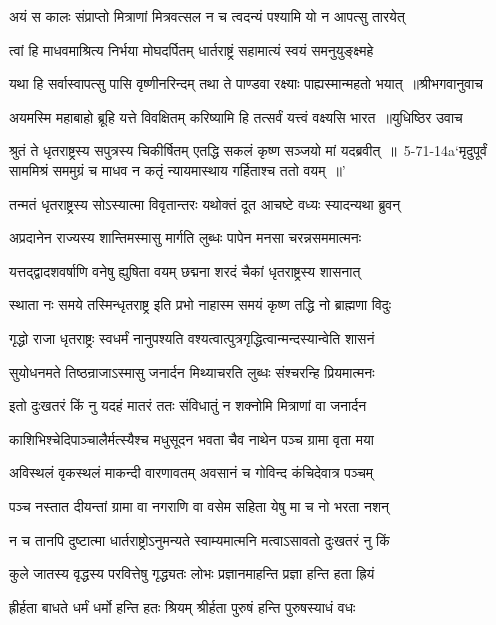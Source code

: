\twolineshloka
{अयं स कालः संप्राप्तो मित्राणां मित्रवत्सल}
{न च त्वदन्यं पश्यामि यो न आपत्सु तारयेत्}


\twolineshloka
{त्वां हि माधवमाश्रित्य निर्भया मोघदर्पितम्}
{धार्तराष्ट्रं सहामात्यं स्वयं समनुयुङ्क्ष्महे}


\threelineshloka
{यथा हि सर्वास्वापत्सु पासि वृष्णीनरिन्दम्}
{तथा ते पाण्डवा रक्ष्याः पाह्यस्मान्महतो भयात् ॥श्रीभगवानुवाच}
{}


\threelineshloka
{अयमस्मि महाबाहो ब्रूहि यत्ते विवक्षितम्}
{करिष्यामि हि तत्सर्वं यत्त्वं वक्ष्यसि भारत ॥युधिष्ठिर उवाच}
{}


\threelineshloka
{श्रुतं ते धृतराष्ट्रस्य सपुत्रस्य चिकीर्षितम्}
{एतद्धि सकलं कृष्ण सञ्जयो मां यदब्रवीत् ॥ 5-71-14a`मृदुपूर्वं साममिश्रं सममुग्रं च माधव}
{न कतृं न्यायमास्थाय गर्हिताश्च ततो वयम् ॥'}


\twolineshloka
{तन्मतं धृतराष्ट्रस्य सोऽस्यात्मा विवृतान्तरः}
{यथोक्तं दूत आचष्टे वध्यः स्यादन्यथा ब्रुवन्}


\twolineshloka
{अप्रदानेन राज्यस्य शान्तिमस्मासु मार्गति}
{लुब्धः पापेन मनसा चरन्नसममात्मनः}


\twolineshloka
{यत्तद्द्वादशवर्षाणि वनेषु ह्युषिता वयम्}
{छद्मना शरदं चैकां धृतराष्ट्रस्य शासनात्}


\twolineshloka
{स्थाता नः समये तस्मिन्धृतराष्ट्र इति प्रभो}
{नाहास्म समयं कृष्ण तद्धि नो ब्राह्मणा विदुः}


\twolineshloka
{गृद्धो राजा धृतराष्ट्रः स्वधर्मं नानुपश्यति}
{वश्यत्वात्पुत्रगृद्धित्वान्मन्दस्यान्वेति शासनं}


\twolineshloka
{सुयोधनमते तिष्ठन्राजाऽस्मासु जनार्दन}
{मिथ्याचरति लुब्धः संश्चरन्हि प्रियमात्मनः}


\twolineshloka
{इतो दुःखतरं किं नु यदहं मातरं ततः}
{संविधातुं न शक्नोमि मित्राणां वा जनार्दन}


\twolineshloka
{काशिभिश्चेदिपाञ्चालैर्मत्स्यैश्च मधुसूदन}
{भवता चैव नाथेन पञ्च ग्रामा वृता मया}


\twolineshloka
{अविस्थलं वृकस्थलं माकन्दी वारणावतम्}
{अवसानं च गोविन्द कंचिदेवात्र पञ्चम्}


\twolineshloka
{पञ्च नस्तात दीयन्तां ग्रामा वा नगराणि वा}
{वसेम सहिता येषु मा च नो भरता नशन्}


\twolineshloka
{न च तानपि दुष्टात्मा धार्तराष्ट्रोऽनुमन्यते}
{स्वाम्यमात्मनि मत्वाऽसावतो दुःखतरं नु किं}


\twolineshloka
{कुले जातस्य वृद्धस्य परवित्तेषु गृद्ध्यतः}
{लोभः प्रज्ञानमाहन्ति प्रज्ञा हन्ति हता ह्रियं}


\twolineshloka
{ह्रीर्हता बाधते धर्मं धर्मो हन्ति हतः श्रियम्}
{श्रीर्हता पुरुषं हन्ति पुरुषस्याधं वधः}


